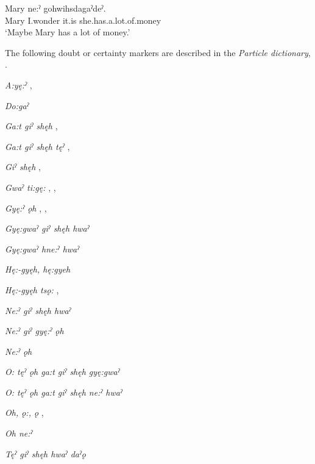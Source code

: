 \ea\label{ex:doubtcertainty2}
 \gll Mary  ne:ˀ gohwihsdagaˀdeˀ. \\
Mary I.wonder it.is she.has.a.lot.of.money\\
\glt ‘Maybe Mary has a lot of money.’
\z

The following doubt or certainty markers are described in the \textit{Particle dictionary}, .

\begin{CayugaRelated}
\item{}\textit{A:yę:ˀ} , \\
\item{}\textit{Do:gaˀ} \\
\item{}\textit{Ga:t giˀ shęh} , \\
\item{}\textit{Ga:t giˀ shęh tęˀ} , \\
\item{}\textit{Giˀ shęh} , \\
\item{}\textit{Gwaˀ ti:gę:} , , \\
\item{}\textit{Gyę:ˀ ǫh} , , \\
\item{}\textit{Gyę:gwaˀ giˀ shęh hwaˀ} \\
\item{}\textit{Gyę:gwaˀ hne:ˀ hwaˀ} \\
\item{}\textit{Hę:-gyęh, hę:gyeh} \\
\item{}\textit{Hę:-gyęh tsǫ:} , \\
\item{}\textit{Ne:ˀ giˀ shęh hwaˀ} \\
\item{}\textit{Ne:ˀ giˀ gyę:ˀ ǫh} \\
\item{}\textit{Ne:ˀ ǫh} \\
\item{}\textit{O: tęˀ ǫh ga:t giˀ shęh gyę:gwaˀ} \\
\item{}\textit{O: tęˀ ǫh ga:t giˀ shęh ne:ˀ hwaˀ} \\
\item{}\textit{Oh, ǫ:, ǫ} , \\
\item{}\textit{Oh ne:ˀ} \\
\item{}\textit{Tęˀ giˀ shęh hwaˀ daˀǫ} 
\end{CayugaRelated}



